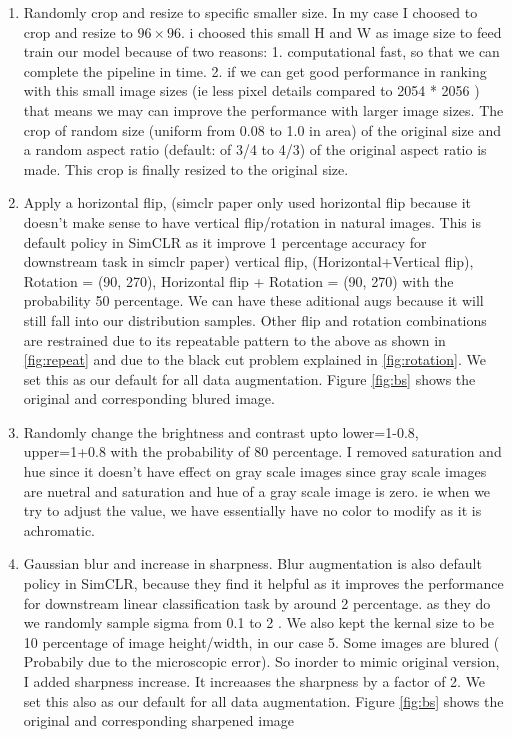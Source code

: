 \begin{enumerate}
  \item Randomly crop  and resize to specific smaller size. In my case I choosed to crop and resize to $96 \times 96$. i choosed this small H and W as 
  image size to feed train our model because of two reasons: 1. computational fast, so that we can complete the pipeline in time. 2. if we can get good performance
   in ranking with this small image sizes (ie less pixel details compared to 2054 * 2056 ) that means we may can improve the performance with larger image sizes. The
   crop of random size (uniform from 0.08 to 1.0 in area) of the original size and a random aspect ratio (default: of 3/4 to 4/3) of the original aspect ratio is 
   made. This crop is finally resized to the original size.

  \item Apply a horizontal flip, (simclr paper only used horizontal flip because it doesn't make sense to have vertical flip/rotation in natural images. This is 
  default policy in SimCLR as it improve 1 percentage accuracy for downstream task in simclr paper) vertical flip, (Horizontal+Vertical flip), Rotation = (90, 270), 
  Horizontal flip + Rotation = (90, 270) with the probability 50 percentage. We can have these aditional augs because it will  still fall into our distribution
  samples. Other flip and rotation combinations are restrained due to its repeatable pattern to the above as shown in \ref{fig:repeat} and due to the black cut 
  problem explained in \ref{fig:rotation}. We set this as our default for all data augmentation. Figure \ref{fig:bs} shows the original and corresponding blured image.

  \item Randomly change the brightness and contrast  upto lower=1-0.8, upper=1+0.8  with the probability of 80 percentage. I removed saturation and hue since it 
  doesn't have effect on gray scale images since gray scale images are  nuetral and saturation and hue of a gray scale image is zero. ie when we try
   to adjust the value, we have essentially have no color to modify as it is achromatic.
   
  
  \item Gaussian blur and increase in sharpness. Blur augmentation is also default policy in SimCLR, because they find it helpful as  it improves the performance 
  for downstream linear classification task by around 2 percentage. as they do we randomly sample sigma from 0.1 to 2 . We also kept the kernal size to be 10 percentage of 
  image height/width, in our case 5. Some images are blured ( Probabily due to the microscopic error). So inorder to mimic original version, I added sharpness 
 increase. It increaases the sharpness by a factor of 2. We set this also as our default for all data augmentation.  Figure \ref{fig:bs} shows the original
  and corresponding sharpened image
\end{enumerate}
